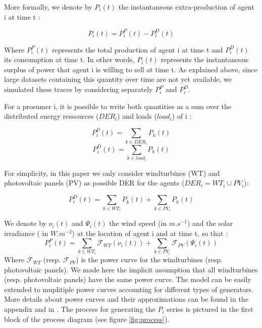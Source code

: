 \documentclass[conference]{IEEEtran}
\begin{document}
More formally, we denote by $ P_{i}(t) $ the instantaneous extra-production of agent i at time t :

\begin{equation}
P_{i}(t) = P_{i}^{P}(t) - P_{i}^{D}(t)
\end{equation}

Where $ P_{i}^{P}(t) $ represents the total production of agent i at time t and $ P_{i}^{D}(t) $ its consumption at time t. In other words, $ P_{i}(t) $ represents the instantaneous surplus of power that agent i is willing to sell at time t. As explained above, since large datasets containing this quantity over time are not yet available, we simulated these traces by considering separately $ P_{i}^{P} $ and $ P_{i}^{D} $.

For a prosumer i, it is possible to write both quantities as a sum over the distributed energy ressources ($ DER_{i} $) and loads ($ load_{i} $) of i : 

\begin{equation}
P_{i}^{P}(t) = \sum_{k \in DER_{i}} P_{k}(t)
\end{equation}
\begin{equation}
P_{i}^{D}(t) = \sum_{k \in load_{i}} P_{k}(t)
\end{equation}

For simplicity, in this paper we only consider windturbines (WT) and photovoltaic panels (PV) as possible DER for the agents ($ DER_{i} = WT_{i} \cup PV_{i} $):  

\begin{equation}
P_{i}^{D}(t) = \sum_{k \in WT_{i}} P_{k}(t) + \sum_{k \in PV_{i}} P_{k}(t)
\end{equation} 

We denote by $ \nu_{i}(t) $ and $ \Psi_{i}(t) $ the wind speed (in $ m.s^{-1} $) and the solar irradiance ( in $ W.m^{-2} $) at the location of agent i and at time t, so that :
\begin{equation}
 P_{i}^{P}(t) = \sum_{k \in WT_{i}} \mathcal{F}_{WT}( \nu_{i}(t) ) + \sum_{k \in PV_{i} } \mathcal{F}_{PV}(\Psi_{i}(t) ) 
\end{equation}
Where $ \mathcal{F}_{WT} $ (resp. $ \mathcal{F}_{PV} $) is the power curve for the windturbines (resp. photovoltaic panels). We made here the implicit assumption that all windturbines (resp. photovoltaic panels) have the same power curve. The model can be easily extended to muplitiple power curves accounting for different types of generators. More details about power curves and their approximations can be found in the appendix and in \cite{Lydia2014}. The process for generating the $ P_{i} $ series is pictured in the first block of the process diagram (see figure \ref{fig:process}).
\end{document}
